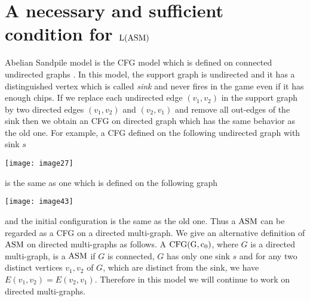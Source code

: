 \documentclass{article}
\theoremstyle{definition}
\begin{document}
\section{A necessary and sufficient condition for ${\rm L(ASM)}$}
\label{fourth section}
Abelian Sandpile model is the CFG model which is defined on connected undirected graphs \cite{BTW87}. In this model, the support graph is undirected and it has a distinguished vertex which is called \emph{sink} and never fires in the game even if it has enough chips. If we replace each undirected edge $(v_1,v_2)$ in the support graph by two directed edges $(v_1,v_2)$ and $(v_2,v_1)$ and remove all out-edges of the sink then we obtain an CFG on directed graph which has the same behavior as the old one. For example, a CFG defined on the following undirected graph with sink $s$
\begin{center}
\texttt{[image: image27]}
\end{center}
is the same as one which is defined on the following graph
\begin{center}
\texttt{[image: image43]}
\end{center}
and the initial configuration is the same as the old one. Thus a ${\rm ASM}$ can be regarded as a CFG on a directed multi-graph. We give an alternative definition of ${\rm ASM}$ on directed multi-graphs as follows. A ${\rm CFG(G,c_0)}$, where $G$ is a directed multi-graph, is a ${\rm ASM}$ if $G$ is connected, $G$ has only one sink $s$ and for any two distinct vertices $v_1,v_2$ of $G$, which are distinct from the sink, we have $E(v_1,v_2)=E(v_2,v_1)$. Therefore in this model we will continue to work on directed multi-graphs. 
\end{document}
